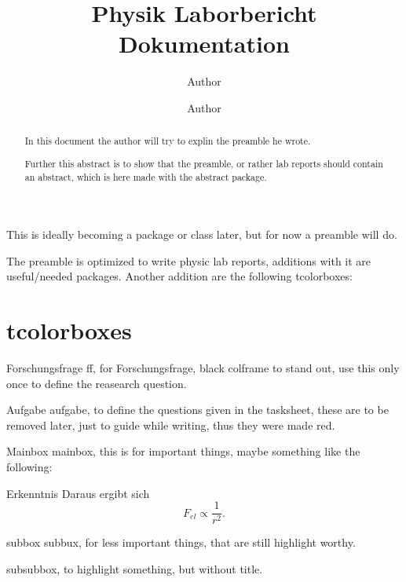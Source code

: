 \documentclass[twocolumn]{article}
\author[1]{Author}
\author[2]{Author}
\affil[1]{Author's institution}
\affil[2]{Another Author's institution}
\title{Physik Laborbericht Dokumentation}
\date{}
\begin{document}
\maketitle


\begin{abstract}
  In this document the author will try to explin the preamble he wrote.

  Further this abstract is to show that the preamble, or rather lab reports
  should contain an abstract, which is here made with the abstract package.
\end{abstract}

This is ideally becoming a package or class later, but for now a preamble will do.

The preamble is optimized to write physic lab reports, additions with it are
useful/needed packages. Another addition are the following tcolorboxes:
    



\section{tcolorboxes}
\label{sec:tcol}


\begin{ff}{Forschungsfrage}
    ff, for Forschungsfrage, black colframe to stand out, use this only once to define the reasearch question.
\label{Forschungsfrage}
\end{ff}


\begin{aufgabe}{Aufgabe}
    aufgabe, to define the questions given in the tasksheet, these are to be
    removed later, just to guide while writing, thus they were made red.
\label{aufgabe-1}
\end{aufgabe}


\begin{mainbox}{Mainbox}
    mainbox, this is for important things, maybe something like the following:

\begin{mainbox}{Erkenntnis}
    Daraus ergibt sich
    \[ F_{el} \propto \frac{1}{r^2} .\] 
\end{mainbox}
\end{mainbox}


\begin{subbox}{subbox}
    subbux, for less important things, that are still highlight worthy.
\end{subbox}


\begin{subsubbox}
    subsubbox, to highlight something, but without title.
\end{subsubbox}
\end{document}
